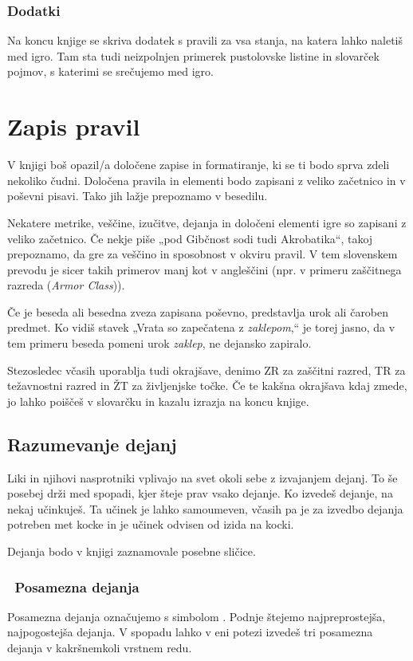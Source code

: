 \subsubsection{Dodatki}
Na koncu knjige se skriva dodatek s pravili za vsa stanja, na katera lahko naletiš med igro. Tam sta tudi neizpolnjen primerek pustolovske listine in slovarček pojmov, s katerimi se srečujemo med igro.

\section{Zapis pravil}
V knjigi boš opazil/a določene zapise in formatiranje, ki se ti bodo sprva zdeli nekoliko čudni. Določena pravila in elementi bodo zapisani z veliko začetnico in v poševni pisavi. Tako jih lažje prepoznamo v besedilu.

Nekatere metrike, veščine, izučitve, dejanja in določeni elementi igre so zapisani z veliko začetnico. Če nekje piše „pod Gibčnost sodi tudi Akrobatika“, takoj prepoznamo, da gre za veščino in sposobnost v okviru pravil. V tem slovenskem prevodu je sicer takih primerov manj kot v angleščini (npr. v primeru zaščitnega razreda (\textit{Armor Class})).

Če je beseda ali besedna zveza zapisana poševno, predstavlja urok ali čaroben predmet. Ko vidiš stavek „Vrata so zapečatena z \textit{zaklepom},“ je torej jasno, da v tem primeru beseda pomeni urok \textit{zaklep}, ne dejansko zapiralo.

Stezosledec včasih uporablja tudi okrajšave, denimo ZR za zaščitni razred, TR za težavnostni razred in ŽT za življenjske točke. Če te kakšna okrajšava kdaj zmede, jo lahko poiščeš v slovarčku in kazalu izrazja na koncu knjige.

\subsection{Razumevanje dejanj}
Liki in njihovi nasprotniki vplivajo na svet okoli sebe z izvajanjem dejanj. To še posebej drži med spopadi, kjer šteje prav vsako dejanje. Ko izvedeš dejanje, na nekaj učinkuješ. Ta učinek je lahko samoumeven, včasih pa je za izvedbo dejanja potreben met kocke in je učinek odvisen od izida na kocki.

Dejanja bodo v knjigi zaznamovale posebne sličice.

\subsubsection{\oneaction~Posamezna dejanja}
Posamezna dejanja označujemo s simbolom \oneaction. Podnje štejemo najpreprostejša, najpogostejša dejanja. V spopadu lahko v eni potezi izvedeš tri posamezna dejanja v kakršnemkoli vrstnem redu.

